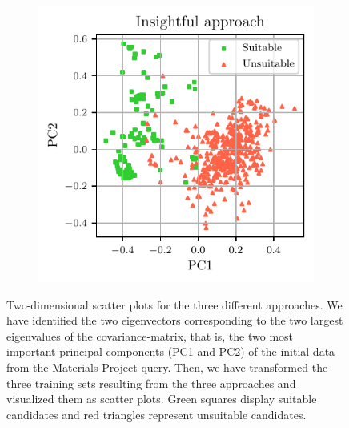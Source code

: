 \documentclass[superscriptaddress,unsortedaddress,
 amsmath,amssymb,
 aps,
]{revtex4-2}
\begin{document}
\begin{figure}[h]
\begin{subfigure}{0.3\textwidth}
    \end{subfigure}
    \begin{subfigure}{0.3\textwidth}
        \centering
        \includegraphics[width=1\textwidth]{figures/pca-2d-plots/03-insightful-approach.pdf}
    \end{subfigure}
    \vspace*{-95mm}
    \caption{Two-dimensional scatter plots for the three different approaches. We have identified the two eigenvectors corresponding to the two largest eigenvalues of the covariance-matrix, that is, the two most important principal components (PC1 and PC2) of the initial data from the Materials Project query. Then, we have transformed the three training sets resulting from the three approaches and visualized them as scatter plots. Green squares display suitable candidates and red triangles represent unsuitable candidates.}
    \label{fig:2dscatterplotpca}
\end{figure}
\end{document}
